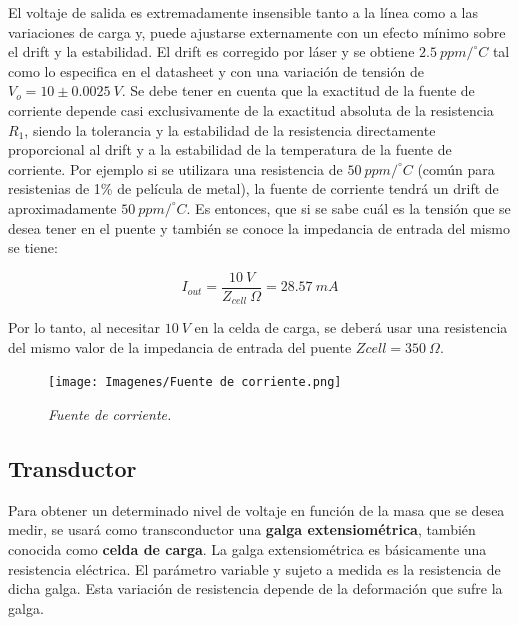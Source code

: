 \documentclass[12pt,A4paper,titlepage]{article}
\begin{document}
    \bigskip
    \hspace{1mm} El voltaje de salida es extremadamente insensible tanto a la línea como a las variaciones de carga y, puede ajustarse externamente con un efecto mínimo sobre el drift y la estabilidad. El drift es corregido por láser y se obtiene \(2.5~ppm/^\circ C \) tal como lo especifica en el datasheet y con una variación de tensión de \(V_o = 10 \pm 0.0025~V \). Se debe tener en cuenta que la exactitud de la fuente de corriente depende casi exclusivamente de la exactitud absoluta de la resistencia \(R_1 \), siendo la tolerancia y la estabilidad de la resistencia directamente proporcional al drift y a la estabilidad de la temperatura de la fuente de corriente.  Por ejemplo si se utilizara una resistencia de \(50~ppm/ ^\circ C \) (común para resistenias de 1\% de película de metal), la fuente de corriente tendrá un drift de aproximadamente \(50~ppm/ ^\circ C \). Es entonces, que si se sabe cuál es la tensión que se desea tener en el puente y también se conoce la impedancia de entrada del mismo se tiene:
    
    \bigskip
    \begin{equation}
        I_{out} = \frac{10~V}{Z_{cell}~\Omega}=28.57~mA
    \end{equation}
    
    \bigskip
    \hspace{1mm}  Por lo tanto, al necesitar \(10~V\) en la celda de carga, se deberá usar una resistencia del mismo valor de la impedancia de entrada del puente \(Zcell = 350~\Omega \). 

\begin{figure}[!h] 
  \centering
  \texttt{[image: Imagenes/Fuente de corriente.png]}
  \caption{\textit{Fuente de corriente.}}
\end{figure}

\newpage

\subsection{Transductor}

\hspace{1mm} Para obtener un determinado nivel de voltaje en función de la masa que se desea medir, se usará como transconductor una \textbf{galga extensiométrica}, también conocida como \textbf{celda de carga}. La galga extensiométrica es básicamente una resistencia eléctrica. El parámetro variable y sujeto a medida es la resistencia de dicha galga. Esta variación de resistencia depende de la deformación que sufre la galga.
\end{document}
